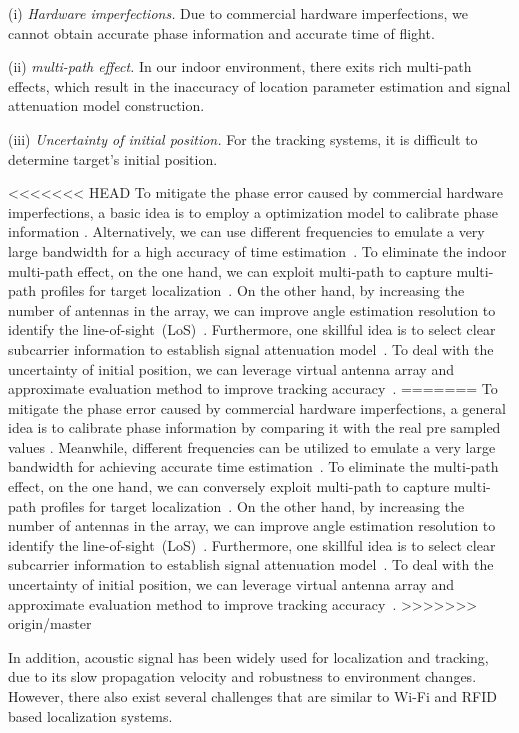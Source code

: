 (i) \emph{Hardware imperfections.} Due to commercial hardware imperfections, we cannot obtain accurate phase information and accurate time of flight.

(ii) \emph{multi-path effect.} In our indoor environment, there exits rich  multi-path effects, which result in the inaccuracy of location parameter estimation and signal attenuation model construction.

(iii) \emph{Uncertainty of initial position.} For the tracking systems, it is difficult to determine target's initial position.


<<<<<<< HEAD
 To mitigate the phase error caused by commercial hardware imperfections, a basic idea is to employ a optimization model to calibrate phase
 information \cite{Wang2016D}. Alternatively, we can use different frequencies to emulate a very large bandwidth for a high accuracy of
 time estimation~\cite{RFind}. To eliminate the indoor multi-path effect, on the one hand, we can exploit multi-path to capture multi-path
 profiles for target localization~\cite{PinIt}. On the other hand, by increasing the number of antennas in the array, we can improve angle
 estimation resolution to identify the line-of-sight~(LoS)~\cite{Arraytrack, Spotfi}. Furthermore, one skillful idea is to select clear
 subcarrier information to establish signal attenuation model~\cite{wang2016lifs}. To deal with the uncertainty of initial position, we can
 leverage virtual antenna array and approximate evaluation method to improve tracking accuracy~\cite{Tagoram}.
=======
 To mitigate the phase error caused by commercial hardware imperfections, a general idea is to calibrate phase information by comparing it with the real pre sampled values \cite{Wang2016D}. Meanwhile, different frequencies can be utilized to emulate a very large bandwidth for achieving accurate time estimation~\cite{RFind}. To eliminate the multi-path effect, on the one hand, we can conversely exploit multi-path to capture multi-path profiles for target localization~\cite{PinIt}. On the other hand, by increasing the number of antennas in the array, we can improve angle estimation resolution to identify the line-of-sight~(LoS)~\cite{Arraytrack, Spotfi}. Furthermore, one skillful idea is to select clear subcarrier information to establish signal attenuation model~\cite{wang2016lifs}. To deal with the uncertainty of initial position, we can leverage virtual antenna array and approximate evaluation method to improve tracking accuracy~\cite{Tagoram}.
>>>>>>> origin/master

In addition, acoustic signal has been widely used for localization and tracking, due to its slow propagation velocity and robustness to
environment changes. However, there also exist several challenges that are similar to Wi-Fi and RFID based localization systems.

